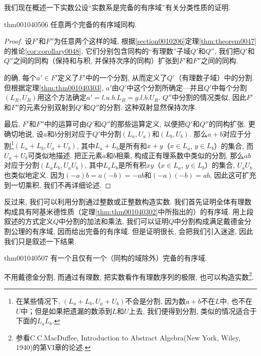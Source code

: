 我们现在概述一下实数公设“实数系是完备的有序域”有关分类性质的证明. 

\begin{theorem}{}{thm001040506}
任意两个完备的有序域同构. 
\end{theorem}

\begin{proof}
设$F'$和$F''$为任意两个这样的域, 根据\ref{section0010206}定理\ref{thm:theorem0047}的推论\ref{cor:corollary0048}, 它们分别包含同构的“有理数”子域$Q'$和$Q''$, 我们把$Q'$和$Q''$之间的同构（保持和与积, 并保持次序的同构）扩张到$F'$和$F''$之间的同构. 

的确, 每个$a' \in F'$定义了$F'$中的一个分割, 从而定义了$Q'$（有理数子域）中的分割. 但根据定理\ref{thm:thm001040303}, $a'$由$Q'$中这个分割所确定---并且$Q'$中每个分割$(L_R, U_R)$用这个方法确定$a'=l.u.b.L_R = g.l.b.U_R$. $Q''$中分割的情况类似, 因此$F'$和$F''$的元素分别双射到$Q'$和$Q''$的分割. 这种双射显然保持次序. 

最后, $F'$和$F''$中的运算可由$Q'$和$Q''$的那些运算定义, 以便把$Q'$和$Q''$的同构扩张. 更确切地说, 设$a$和$b$分别对应于$Q'$中分割$(L_a, U_a)$和$(L_b, U_b)$. 那么$a+b$对应于分割\footnote{在某些情况下, $(L_a+L_b, U_a+U_b)$不会是分割, 因为数$a+b$不在$L$中, 也不在$U$中；但是如果把遗漏的数添到$L$和$U$上去, 我们便得到分割, 类似的情况适合于下面的$L_aL_b$.}$(L_a+L_b, U_a+U_b)$, 其中$L_a+L_b$是所有和$x+y$（$x \in L_a$, $y \in L_b$）的集合, 而$U_a+U_b$可类似地描述. 把正元素$a$和$b$相乘, 构成正有理系数中类似的分割, 那么$ab$对应于分割$(L_aL_b, U_aU_b)$, 其中$L_aL_b$是所有积$xy$（$x \in L_a$, $y \in L_b$）的集合, $U_aU_b$也类似地定义. 因为$(-a)b=a(-b)=-ab$和$(-a)(-b)=ab$, 因此这可扩充到一切乘积, 我们不再详细论述.  
\end{proof}

反过来, 我们可以利用分割通过整数或正整数构造实数. 我们首先证明全体有理数构成具有阿基米德性质（定理\ref{thm:thm001040302}中所指出的）的有序域. 用上段叙述的方式定义$Q$中分割的加法和乘法, 我们可以证明$Q$中分割构成满足戴德金分割公理的有序域, 因而给出完备的有序域. 但是证明很长, 会把我们引入迷途, 因此我们只是叙述一下结果. 

\begin{theorem}{}{thm001040507}
有一个且仅有一个（同构的域除外）完备的有序域. 
\end{theorem}

不用戴德金分割, 而通过有理数, 把实数看作有理数序列的极限, 也可以构造实数\footnote{参看C.C.MacDuffee, Introduction to Abstract Algebra(New York, Wiley, 1940)的第VI章的论述. }. 

